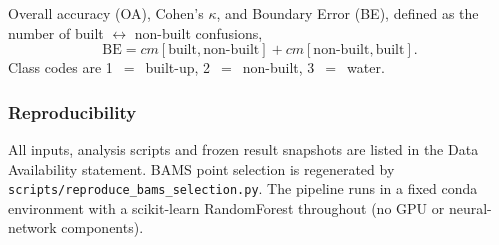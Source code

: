 Overall accuracy (OA), Cohen's $\kappa$, and Boundary Error (BE), defined as the
number of built $\leftrightarrow$ non-built confusions,
%
\begin{equation}\label{eq:be}
\mathrm{BE} = cm[\text{built}, \text{non-built}] + cm[\text{non-built}, \text{built}].
\end{equation}
%
Class codes are 1~$=$~built-up, 2~$=$~non-built, 3~$=$~water.

\subsubsection*{Reproducibility}

All inputs, analysis scripts and frozen result snapshots are listed in the Data
Availability statement. BAMS point selection is regenerated by
\texttt{scripts/reproduce\_bams\_selection.py}. The pipeline runs in a fixed
conda environment with a scikit-learn RandomForest throughout (no GPU or
neural-network components).

